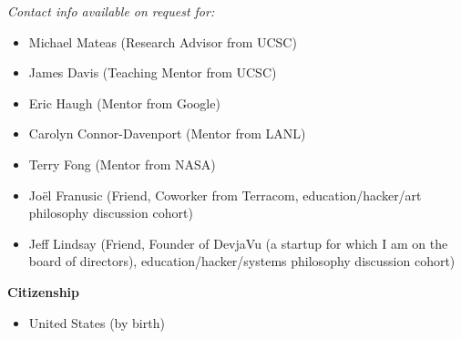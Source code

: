 \documentclass[10pt]{article}
\begin{document}
\textit{Contact info available on request for:}\\
\begin{itemize}
  \item Michael Mateas (Research Advisor from UCSC)
  \item James Davis (Teaching Mentor from UCSC)
  \item Eric Haugh (Mentor from Google)
  \item Carolyn Connor-Davenport (Mentor from LANL)
  \item Terry Fong (Mentor from NASA)
  \item Jo\"{e}l Franusic (Friend, Coworker from Terracom, education/hacker/art philosophy discussion cohort)
  \item Jeff Lindsay (Friend, Founder of DevjaVu (a startup for which I am on the board of directors), education/hacker/systems philosophy discussion cohort)
\end{itemize}

{\large \textbf{Citizenship}}
\begin{itemize}
  \item United States (by birth)
\end{itemize}


\vspace{0.25in}
\end{document}
